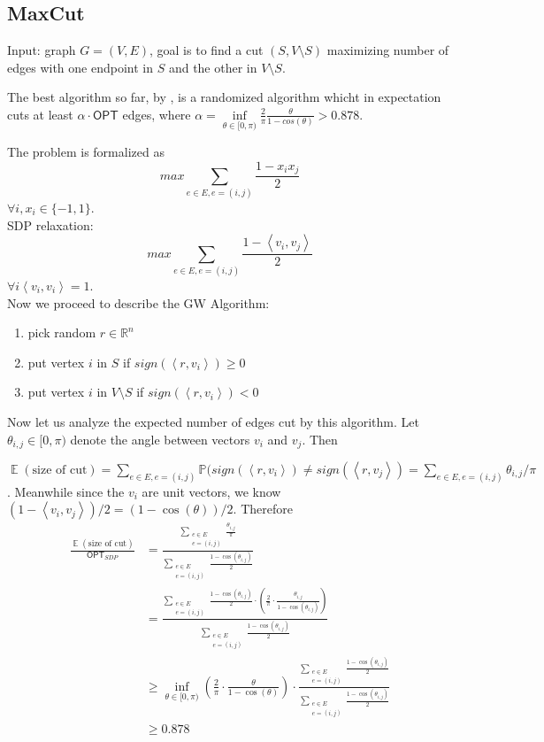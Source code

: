 \documentclass[11pt]{article}
\DeclareMathOperator*{\E}{\mathbb{E}}
\newcommand{\inprod}[1]{\left\langle #1 \right\rangle}
\begin{document}
\subsection{MaxCut}
Input: graph $G = (V,E)$, goal is to find a cut $(S,V\setminus S)$ maximizing number of edges with one endpoint in $S$ and the other in $V\setminus S$.

The best algorithm so far, by \cite{GoemansW95}, is a randomized algorithm whicht in expectation cuts at least $\alpha\cdot \textsf{OPT}$ edges, where $\alpha = \underset{\theta \in[0,\pi)}{\inf} \frac{2}{\pi}\frac{\theta}{1-cos(\theta)} > 0.878$.

The problem is formalized as 
$$max\sum_{e \in E, e =(i,j)} \frac{1-x_ix_j}{2}$$
$\forall i, x_i \in \{-1,1\}$. \\

SDP relaxation: 
$$max \sum_{e\in E, e = (i,j)} \frac{1-\inprod{v_i,v_j}}{2}$$
$\forall i \inprod{v_i,v_i} = 1$.
\\

Now we proceed to describe the GW Algorithm:
\begin{enumerate}
\item pick random $r \in \mathbb{R}^n$
\item put vertex $i$ in $S$ if $sign(\inprod{r,v_i})\ge 0$
\item put vertex $i$ in $V\setminus S$ if $sign(\inprod{r,v_i}) < 0$
\end{enumerate}

Now let us analyze the expected number of edges cut by this algorithm. Let $\theta_{i,j}\in[0,\pi)$ denote the angle between vectors $v_i$ and $v_j$. Then

$\E(\text{size of cut}) = \sum_{e\in E, e=(i,j)} \mathbb{P}(sign(\inprod{r,v_i})\neq sign(\inprod{r,v_j}) = \sum_{e\in E, e=(i,j)} \theta_{i,j}/\pi$. Meanwhile since the $v_i$ are unit vectors, we know $(1-\inprod{v_i,v_j})/2 = (1 - \cos(\theta))/2$. Therefore
\begin{align*}
\frac{\E(\text{size of cut})}{\textsf{OPT}_{SDP}} &= \frac{\sum_{\substack{e\in E\\ e=(i,j)}} \frac{\theta_{i,j}}{\pi}}{\sum_{\substack{e\in E\\e=(i,j)}} \frac{1 - \cos(\theta_{i,j})}{2}}\\
{}&= \frac{\sum_{\substack{e\in E\\ e=(i,j)}} \frac{1 - \cos(\theta_{i,j})}{2} \cdot \left(\frac{2}{\pi}\cdot \frac{\theta_{i,j}}{1-\cos(\theta_{i,j})}\right)}{\sum_{\substack{e\in E\\e=(i,j)}} \frac{1 - \cos(\theta_{i,j})}{2}}\\
{}&\ge \inf_{\theta\in[0,\pi)} \left(\frac{2}{\pi}\cdot \frac{\theta}{1-\cos(\theta)}\right) \cdot \frac{\sum_{\substack{e\in E\\ e=(i,j)}} \frac{1 - \cos(\theta_{i,j})}{2}}{\sum_{\substack{e\in E\\e=(i,j)}} \frac{1 - \cos(\theta_{i,j})}{2}}\\
{}&\ge 0.878
\end{align*}
\end{document}
